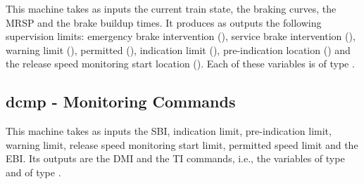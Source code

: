 \documentclass{template/openetcs_article}
\begin{document}
This machine takes as inputs the current train state, the braking curves, the
MRSP and the brake buildup times. It produces as outputs the following
supervision limits: emergency brake intervention (), service brake
intervention (), warning limit (), permitted
(), indication limit (), pre-indication location
() and the release speed monitoring start location
(). Each of these variables is of type
.


{\footnotesize

}

\subsection{dcmp - Monitoring Commands}
\label{sec:dcmp-monit-comm}

This machine takes as inputs the SBI, indication limit, pre-indication limit,
warning limit, release speed monitoring start limit, permitted speed limit and
the EBI. Its outputs are the DMI and the TI commands, i.e., the variables
 of type  and 
of type .

{\footnotesize

}



\end{document}
